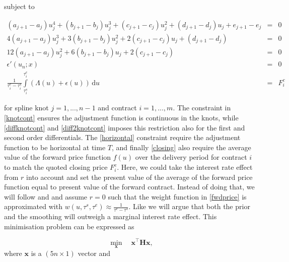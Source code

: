 \noindent subject to

\begin{align}
(a_{j+1}-a_{j})u_j^4+(b_{j+1}-b_{j})u_j^3+(c_{j+1}-c_{j})u_j^2+(d_{j+1}-d_{j})u_j+e_{j+1}-e_j & = & 0 \label{knotcont} \tag{a} \\
4(a_{j+1}-a_{j})u_j^3+3(b_{j+1}-b_{j})u_j^2+2(c_{j+1}-c_{j})u_j+(d_{j+1}-d_{j}) & = & 0  \label{diffknotcont} \tag{b} \\
12(a_{j+1}-a_{j})u_j^2+6(b_{j+1}-b_{j})u_j+2(c_{j+1}-c_{j}) & = & 0 \label{diff2knotcont} \tag{c}\\
\epsilon'(u_n;x) & = & 0 \label{horizontal} \tag{d} \\
\frac{1}{\tau^e_i-\tau^s_i}\int\limits_{\tau^s_i}^{\tau^e_i}{(\Lambda(u)+\epsilon(u))}\,\mathrm{d}u & = & F^c_i \label{closing} \tag{e}
\end{align}



\noindent for spline knot $j = 1, ..., n-1$ and contract $i = 1, ..., m$. The constraint in \eqref{knotcont} ensures the adjustment function is continuous in the knots, while \eqref{diffknotcont} and \eqref{diff2knotcont} imposes this restriction also for the first and second order differentials. The \eqref{horizontal} constraint require the adjustment function to be horizontal at time $T$, and finally \eqref{closing} also require the average value of the forward price function $f(u)$ over the delivery period for contract $i$ to match the quoted closing price $F^c_i$. Here, we could take the interest rate effect from $r$ into account and set the present value of the average of the forward price function equal to present value of the forward contract. Instead of doing that, we will follow \citet{benth2008stochastic} and \citet{ollmar2003analysis} and assume $r=0$ such that the weight function in \ref{fwdprice} is approximated with $w(u,\tau^s,\tau^e)\approx\frac{1}{\tau^e-\tau^s}$. Like \citet{benth2008stochastic} we will argue that both the prior and the smoothing will outweigh a marginal interest rate effect. This minimisation problem can be expressed as

\begin{equation*}
\min_{\mathbf{x}} \quad {\mathbf{x}^\intercal \mathbf{Hx}},
\end{equation*}
where $\textbf{x}$ is a $(5n \times 1)$ vector and

